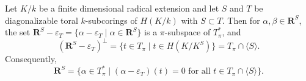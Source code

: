 Let $K/k$ be a finite dimensional radical extension and let $S$ and $T$ be diagonalizable toral $k$-subcorings of $H(K/k)$ with $S \subset T$. Then for $\alpha, \beta \in \mathbf{R}^S$, the set $\mathbf{R}^S - \varepsilon_T = \{\alpha - \varepsilon_T \mid \alpha \in \mathbf{R}^S\}$ is a $\pi$-subspace of $T^*_\pi$, and
$$(\mathbf{R}^S - \varepsilon_T)^{\perp} = \{t \in T_\pi \mid t \in H(K/K^S)\} = T_\pi \cap \langle S \rangle.$$
Consequently,
$$\mathbf{R}^S = \{\alpha \in T^*_\pi \mid (\alpha - \varepsilon_T)(t) = 0 \text{ for all } t \in T_\pi \cap \langle S \rangle\}.$$
